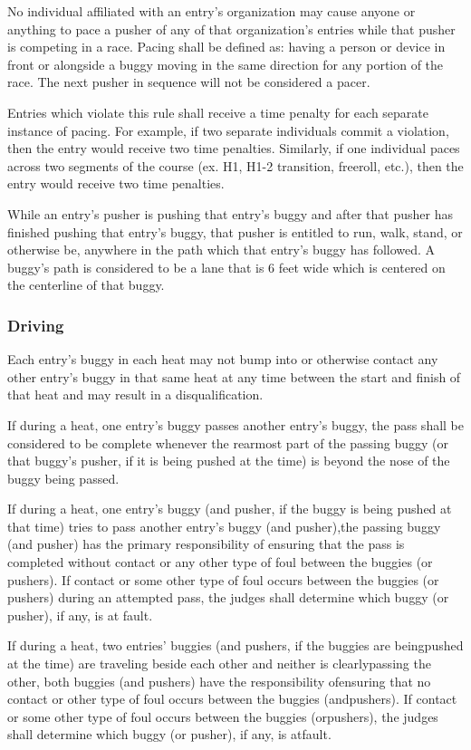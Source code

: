 	No individual affiliated with an entry’s organization may cause anyone or anything to pace a pusher of any of that organization’s entries while that pusher is competing in a race. Pacing shall be defined as: having a person or device in front or alongside a buggy moving in the same direction for any portion of the race. The next pusher in sequence will not be considered a pacer.

    Entries which violate this rule shall receive a time penalty for each separate instance of pacing. For example, if two separate individuals commit a violation, then the entry would receive two time penalties. Similarly, if one individual paces across two segments of the course (ex. H1, H1-2 transition, freeroll, etc.), then the entry would receive two time penalties.

	While an entry's pusher is pushing that entry's buggy and after that pusher has finished pushing that entry's buggy, that pusher is entitled to run, walk, stand, or otherwise be, anywhere in the path which that entry's buggy has followed. A buggy's path is considered to be a lane that is 6 feet wide which is centered on the centerline of that buggy.

\subsubsection{Driving}

	Each entry's buggy in each heat may not bump into or otherwise contact any other entry's buggy in that same heat at any time between the start and finish of that heat and may result in a disqualification.

	If during a heat, one entry's buggy passes another entry's buggy, the pass shall be considered to be complete whenever the rearmost part of the passing buggy (or that buggy's pusher, if it is being pushed at the time) is beyond the nose of the buggy being passed.

	If during a heat, one entry's buggy (and pusher, if the buggy is being pushed at that time) tries to pass another entry's buggy (and pusher),the passing buggy (and pusher) has the primary responsibility of ensuring that the pass is completed without contact or any other type of foul between the buggies (or pushers). If contact or some other type of foul occurs between the buggies (or pushers) during an attempted pass, the judges shall determine which buggy (or pusher), if any, is at fault.

	If during a heat, two entries' buggies (and pushers, if the buggies are beingpushed at the time) are traveling beside each other and neither is clearlypassing the other, both buggies (and pushers) have the responsibility ofensuring that no contact or other type of foul occurs between the buggies (andpushers). If contact or some other type of foul occurs between the buggies (orpushers), the judges shall determine which buggy (or pusher), if any, is atfault.

